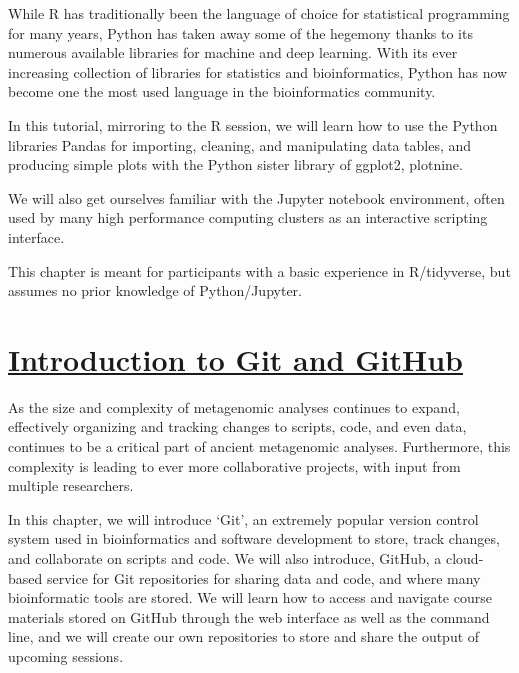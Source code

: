 \documentclass[
  letterpaper,
]{book}
\begin{document}

While R has traditionally been the language of choice for statistical
programming for many years, Python has taken away some of the hegemony
thanks to its numerous available libraries for machine and deep
learning. With its ever increasing collection of libraries for
statistics and bioinformatics, Python has now become one the most used
language in the bioinformatics community.

In this tutorial, mirroring to the R session, we will learn how to use
the Python libraries Pandas for importing, cleaning, and manipulating
data tables, and producing simple plots with the Python sister library
of ggplot2, plotnine.

We will also get ourselves familiar with the Jupyter notebook
environment, often used by many high performance computing clusters as
an interactive scripting interface.

This chapter is meant for participants with a basic experience in
R/tidyverse, but assumes no prior knowledge of Python/Jupyter.

\hypertarget{introduction-to-git-and-github}{%
\section*{\texorpdfstring{\protect\hyperlink{introduction-to-github}{Introduction
to Git and
GitHub}}{Introduction to Git and GitHub}}\label{introduction-to-git-and-github}}


As the size and complexity of metagenomic analyses continues to expand,
effectively organizing and tracking changes to scripts, code, and even
data, continues to be a critical part of ancient metagenomic analyses.
Furthermore, this complexity is leading to ever more collaborative
projects, with input from multiple researchers.

In this chapter, we will introduce `Git', an extremely popular version
control system used in bioinformatics and software development to store,
track changes, and collaborate on scripts and code. We will also
introduce, GitHub, a cloud-based service for Git repositories for
sharing data and code, and where many bioinformatic tools are stored. We
will learn how to access and navigate course materials stored on GitHub
through the web interface as well as the command line, and we will
create our own repositories to store and share the output of upcoming
sessions.
\end{document}
